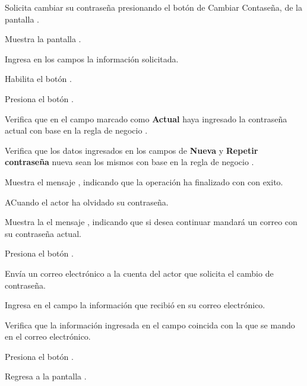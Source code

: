 \begin{UCtrayectoria}

	\UCpaso [\UCactor]Solicita cambiar su contraseña presionando el botón  de Cambiar Contaseña, de la pantalla .
	
	\UCpaso Muestra la pantalla .
	
	\UCpaso [\UCactor] Ingresa en los campos la información solicitada.   
	
	\UCpaso Habilita el botón . 
	
	\UCpaso [\UCactor] Presiona el botón . 
	
	\UCpaso Verifica que en el campo marcado como \textbf{Actual} haya ingresado la contraseña actual  con base en la regla de negocio .  
	
	\UCpaso Verifica que los datos ingresados en los campos de \textbf{Nueva} y \textbf{Repetir contraseña} nueva sean los mismos con base en la regla de negocio . 

	\UCpaso  Muestra el mensaje , indicando que la operación ha finalizado con con exito.
	
\end{UCtrayectoria} 

\begin{UCtrayectoriaA}{A}{Cuando el actor ha olvidado su contraseña.}
	
	\UCpaso Muestra la el mensaje , indicando que si desea continuar mandará un correo con su contraseña actual. 
	
	\UCpaso [\UCpaso] Presiona el botón . 
	
	\UCpaso Envía un correo electrónico a la cuenta del actor que solicita el cambio de contraseña.	
	
	\UCpaso [\UCpaso] Ingresa en el campo la información que recibió en su correo electrónico.
	
	\UCpaso Verifica que la información ingresada en el campo coincida con la que se mando en el correo electrónico. 

	\UCpaso Presiona el botón . 

	\UCpaso Regresa a la pantalla .
	
\end{UCtrayectoriaA}

